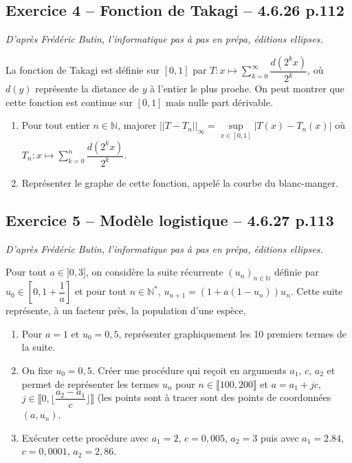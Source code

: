 \documentclass[10pt,fleqn]{article} %
\begin{document}
\begin{multicols}{2}
\subsection*{Exercice 4 -- Fonction de Takagi -- 4.6.26 p.112}
\begin{flushright}
\textit{D'après Frédéric Butin, l'informatique pas à pas en prépa, éditions ellipses.}
\end{flushright}

La fonction de Takagi est définie sur $[0,1]$ par $T:x\mapsto \sum\limits_{k=0}^{\infty} \dfrac{d\left( 2^k x \right)}{2^k}$, où $d(y)$ représente la distance de $y$ à l'entier le plus proche. On peut montrer que cette fonction est continue sur $[0,1]$ mais nulle part dérivable.
\begin{enumerate}
\item Pour tout entier $n\in \mathbb{N}$, majorer $||T-T_n||_{\infty}=\sup\limits_{x\in[0,1]} |T(x)-T_n(x)|$ où $T_n:x \mapsto \sum\limits_{k=0}^{n} \dfrac{d\left( 2^k x \right)}{2^k}$.
\item Représenter le graphe de cette fonction, appelé la courbe du blanc-manger.
\end{enumerate}

\subsection*{Exercice 5 -- Modèle logistique -- 4.6.27 p.113}
\begin{flushright}
\textit{D'après Frédéric Butin, l'informatique pas à pas en prépa, éditions ellipses.}
\end{flushright}

Pour tout $a\in]0,3]$,  on considère la suite récurrente $(u_n)_{n\in\mathbb{N}}$ définie par $u_0 \in \left[ 0,1+\dfrac{1}{a}\right]$ et pour tout $n\in\mathbb{N}^*$, $u_{n+1}=\left(1+a\left(1-u_n \right) \right)u_n$. Cette suite représente, à un facteur près, la population d'une espèce.

\begin{enumerate}
\item Pour $a=1$ et $u_0=0,5$, représenter graphiquement les 10 premiers termes de la suite.
\item On fixe $u_0=0,5$. Créer une procédure qui reçoit en arguments $a_1$, $c$, $a_2$ et permet de représenter les termes $u_n$ pour $n\in \llbracket 100,200 \rrbracket$ et $a=a_1+jc$, $j\in\llbracket 0,\lfloor \dfrac{a_2-a_1}{c}\rfloor \rrbracket$ (les points sont à tracer sont des points de coordonnées $(a,u_n)$.
\item Exécuter cette procédure avec $a_1=2$, $c=0,005$, $a_2=3$ puis avec $a_1=2.84$, $c=0,0001$, $a_2=2,86$.
\end{enumerate}



\end{multicols}
\end{document}
